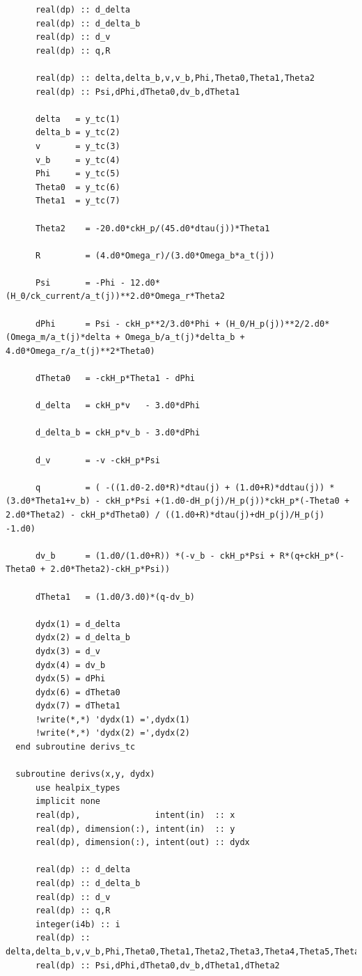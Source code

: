 \documentclass[a4paper]{report}
\begin{document}
\begin{verbatim}
      real(dp) :: d_delta
      real(dp) :: d_delta_b
      real(dp) :: d_v
      real(dp) :: q,R

      real(dp) :: delta,delta_b,v,v_b,Phi,Theta0,Theta1,Theta2
      real(dp) :: Psi,dPhi,dTheta0,dv_b,dTheta1

      delta   = y_tc(1)
      delta_b = y_tc(2)
      v       = y_tc(3)
      v_b     = y_tc(4)
      Phi     = y_tc(5)
      Theta0  = y_tc(6)
      Theta1  = y_tc(7)

      Theta2    = -20.d0*ckH_p/(45.d0*dtau(j))*Theta1

      R         = (4.d0*Omega_r)/(3.d0*Omega_b*a_t(j))

      Psi       = -Phi - 12.d0*(H_0/ck_current/a_t(j))**2.d0*Omega_r*Theta2

      dPhi      = Psi - ckH_p**2/3.d0*Phi + (H_0/H_p(j))**2/2.d0*(Omega_m/a_t(j)*delta + Omega_b/a_t(j)*delta_b + 4.d0*Omega_r/a_t(j)**2*Theta0)

      dTheta0   = -ckH_p*Theta1 - dPhi

      d_delta   = ckH_p*v   - 3.d0*dPhi

      d_delta_b = ckH_p*v_b - 3.d0*dPhi

      d_v       = -v -ckH_p*Psi

      q         = ( -((1.d0-2.d0*R)*dtau(j) + (1.d0+R)*ddtau(j)) *(3.d0*Theta1+v_b) - ckH_p*Psi +(1.d0-dH_p(j)/H_p(j))*ckH_p*(-Theta0 + 2.d0*Theta2) - ckH_p*dTheta0) / ((1.d0+R)*dtau(j)+dH_p(j)/H_p(j) -1.d0)

      dv_b      = (1.d0/(1.d0+R)) *(-v_b - ckH_p*Psi + R*(q+ckH_p*(-Theta0 + 2.d0*Theta2)-ckH_p*Psi))

      dTheta1   = (1.d0/3.d0)*(q-dv_b)

      dydx(1) = d_delta
      dydx(2) = d_delta_b
      dydx(3) = d_v
      dydx(4) = dv_b
      dydx(5) = dPhi
      dydx(6) = dTheta0
      dydx(7) = dTheta1
      !write(*,*) 'dydx(1) =',dydx(1)
      !write(*,*) 'dydx(2) =',dydx(2)
  end subroutine derivs_tc

  subroutine derivs(x,y, dydx) 
      use healpix_types
      implicit none
      real(dp),               intent(in)  :: x
      real(dp), dimension(:), intent(in)  :: y
      real(dp), dimension(:), intent(out) :: dydx

      real(dp) :: d_delta
      real(dp) :: d_delta_b
      real(dp) :: d_v
      real(dp) :: q,R
      integer(i4b) :: i
      real(dp) :: delta,delta_b,v,v_b,Phi,Theta0,Theta1,Theta2,Theta3,Theta4,Theta5,Theta6
      real(dp) :: Psi,dPhi,dTheta0,dv_b,dTheta1,dTheta2


\end{verbatim}
\end{document}
